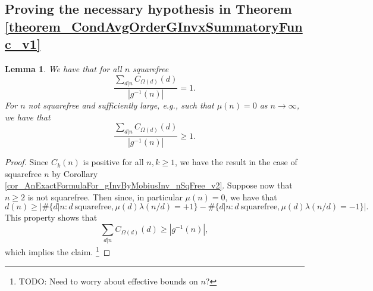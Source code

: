 \documentclass[11pt,reqno,a4letter]{article}
\numberwithin{figure}{section}
\numberwithin{table}{section}
\theoremstyle{plain}
\newtheorem{theorem}{Theorem}
\newtheorem{lemma}[theorem]{Lemma}
\newtheorem{cor}[theorem]{Corollary}
\numberwithin{theorem}{section}
\theoremstyle{definition}
\begin{document}


\subsection{Proving the necessary hypothesis in Theorem \ref{theorem_CondAvgOrderGInvxSummatoryFunc_v1}} 

\begin{lemma} 
\label{lemma_KeyPropsOfBoundsOnTheRatio_v2} 
We have that for all $n$ squarefree 
\[
\frac{\sum\limits_{d|n} C_{\Omega(d)}(d)}{|g^{-1}(n)|} = 1. 
\]
For $n$ not squarefree and sufficiently large, e.g., such that $\mu(n) = 0$ as 
$n \rightarrow \infty$, we have that 
\[
\frac{\sum\limits_{d|n} C_{\Omega(d)}(d)}{|g^{-1}(n)|} \geq 1. 
\]
\end{lemma}
\begin{proof} 
Since $C_k(n)$ is positive for all $n, k \geq 1$, we have the result in the case of 
squarefree $n$ by Corollary \ref{cor_AnExactFormulaFor_gInvByMobiusInv_nSqFree_v2}. 
Suppose now that $n \geq 2$ is not squarefree. Then since, in particular $\mu(n) = 0$, 
we have that 
\[
d(n) \geq \left\lvert \#\{d|n: d \mathrm{\ squarefree}, \mu(d)\lambda(n/d) = +1\} - 
     \#\{d|n: d \mathrm{\ squarefree}, \mu(d)\lambda(n/d) = -1\} \right\rvert. 
\]
This property shows that 
\[
\sum_{d|n} C_{\Omega(d)}(d) \geq |g^{-1}(n)|, 
\]
which implies the claim. \footnote{ 
     TODO: Need to worry about effective bounds on $n$? 
}
\end{proof} 
\end{document}
